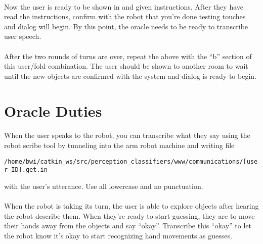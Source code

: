 \documentclass{article}
\begin{document}
\paragraph{} Now the user is ready to be shown in and given instructions. After they have read the instructions, confirm with the robot that you're done testing touches and dialog will begin. By this point, the oracle needs to be ready to transcribe user speech.

\paragraph{} After the two rounds of turns are over, repeat the above with the ``b'' section of this user/fold combination. The user should be shown to another room to wait until the new objects are confirmed with the system and dialog is ready to begin.

\section{Oracle Duties}

\paragraph{} When the user speaks to the robot, you can transcribe what they say using the robot scribe tool by tunneling into the arm robot machine and writing file

\texttt{/home/bwi/catkin\_ws/src/perception\_classifiers/www/communications/[user\_ID].get.in} 

with the user's utterance. Use all lowercase and no punctuation.

\paragraph{} When the robot is taking its turn, the user is able to explore objects after hearing the robot describe them. When they're ready to start guessing, they are to move their hands away from the objects and say ``okay''. Transcribe this ``okay'' to let the robot know it's okay to start recognizing hand movements as guesses.
\end{document}
